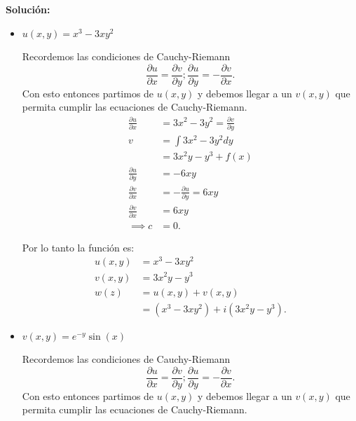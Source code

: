 \documentclass{report}
\begin{document}
\textbf{Solución: }
\begin{itemize}
  \item $u\left( x, y \right) = x^3 - 3xy^2$

    Recordemos las condiciones de Cauchy-Riemann \[
    \frac{\partial u}{\partial x} = \frac{\partial v}{\partial y} ; \frac{\partial u}{\partial y} = - \frac{\partial v}{\partial x} 
    .\] Con esto entonces partimos de $u\left( x, y \right) $ y debemos llegar a un $v\left( x, y \right) $ que permita cumplir las ecuaciones de Cauchy-Riemann.
    \begin{align*}
      \frac{\partial u}{\partial x} &= 3x^2 - 3y^2 = \frac{\partial v}{\partial y} \\
      v &= \int	3x^2 - 3y^2 dy\\
      &= 3x^2y - y^{3} + f\left( x \right) \\
      \frac{\partial u}{\partial y} &= -6xy\\
      \frac{\partial v}{\partial x} &= -\frac{\partial u}{\partial y} = 6xy \\
      \frac{\partial v}{\partial x} &= 6xy \\
      \implies c &= 0
    .\end{align*}
    
    Por lo tanto la función es:
    \begin{align*}
      u\left( x, y \right) &= x^3 - 3xy^2\\
      v\left( x, y \right) &= 3x^2y - y^{3} \\
      w\left( z \right) &= u\left( x, y \right) + v\left( x, y \right)  \\
      &= \left( x^3 - 3xy^2 \right) + i\left( 3x^2y - y^{3} \right)
    .\end{align*}

  \item $v\left( x, y \right) = e^{-y}\sin\left( x \right) $


    Recordemos las condiciones de Cauchy-Riemann \[
    \frac{\partial u}{\partial x} = \frac{\partial v}{\partial y} ; \frac{\partial u}{\partial y} = - \frac{\partial v}{\partial x} 
    .\] Con esto entonces partimos de $u\left( x, y \right) $ y debemos llegar a un $v\left( x, y \right) $ que permita cumplir las ecuaciones de Cauchy-Riemann.


\end{itemize}
\end{document}
